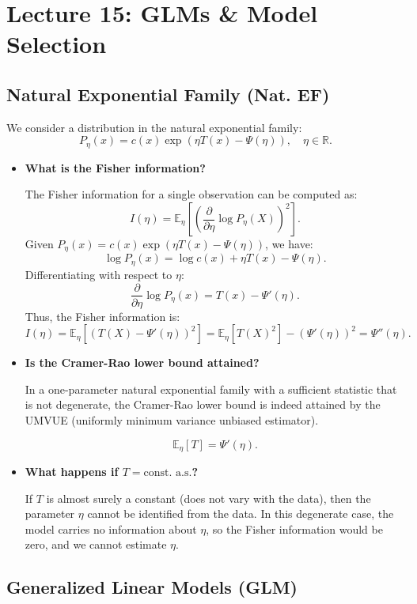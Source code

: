 \documentclass[open=any, 11pt,paper=A4]{scrreprt}
\begin{document}
\chapter{Lecture 15: GLMs \& Model Selection}

\section*{Natural Exponential Family (Nat. EF)}

We consider a distribution in the natural exponential family:
\[
P_\eta(x) = c(x)\exp(\eta T(x) - \Psi(\eta)), \quad \eta \in \mathbb{R}.
\]

\begin{itemize}
    \item \textbf{What is the Fisher information?}
    
    The Fisher information for a single observation can be computed as:
    \[
    I(\eta) = \mathbb{E}_\eta \left[ \left(\frac{\partial}{\partial \eta} \log P_\eta(X)\right)^2 \right].
    \]
    Given $P_\eta(x) = c(x)\exp(\eta T(x) - \Psi(\eta))$, we have:
    \[
    \log P_\eta(x) = \log c(x) + \eta T(x) - \Psi(\eta).
    \]
    Differentiating with respect to $\eta$:
    \[
    \frac{\partial}{\partial \eta} \log P_\eta(x) = T(x) - \Psi'(\eta).
    \]
    Thus, the Fisher information is:
    \[
    I(\eta) = \mathbb{E}_\eta[(T(X)-\Psi'(\eta))^2] = \mathbb{E}_\eta[T(X)^2] - (\Psi'(\eta))^2 = \Psi''(\eta).
    \]

    \item \textbf{Is the Cramer-Rao lower bound attained?}

    In a one-parameter natural exponential family with a sufficient statistic that is not degenerate, the Cramer-Rao lower bound is indeed attained by the UMVUE (uniformly minimum variance unbiased estimator).

    \[
    \mathbb{E}_\eta[T] = \Psi'(\eta).
    \]

    \item \textbf{What happens if $ T = \text{const. a.s.}$?}

    If $T$ is almost surely a constant (does not vary with the data), then the parameter $\eta$ cannot be identified from the data. In this degenerate case, the model carries no information about $\eta$, so the Fisher information would be zero, and we cannot estimate $\eta$.

\end{itemize}


\section*{Generalized Linear Models (GLM)}
\end{document}
